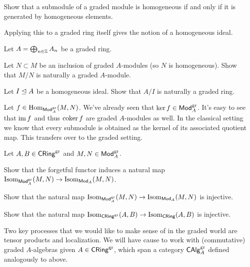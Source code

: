 \documentclass[11pt]{article}
\begin{document}
\begin{exercise}
Show that a submodule of a graded module is homogeneous if and only if it is generated by homogeneous elements.
\end{exercise}

Applying this to a graded ring itself gives the notion of a homogeneous ideal. 

\begin{exercise}
Let $A=\bigoplus_{n\in\mathbb{Z}}A_n$ be a graded ring.
\begin{enum}{\alph}
\item Let $N\subset M$ be an inclusion of graded $A$-modules (so $N$ is homogeneous). Show that $M/N$ is naturally a graded $A$-module.

\item Let $I\trianglelefteq A$ be a homogeneous ideal. Show that $A/I$ is naturally a graded ring.
\end{enum}
\end{exercise}

\begin{remark}
Let $f\in\operatorname{Hom}_{\operatorname{\mathsf{Mod}}_A^{\operatorname{gr}}}(M,N)$. We've already seen that $\ker f\in\operatorname{\mathsf{Mod}}_A^{\operatorname{gr}}$. It's easy to see that $\operatorname{im} f$ and thus $\operatorname{coker} f$ are graded $A$-modules as well. In the classical setting we know that every submodule is obtained as the kernel of its associated quotient map. This transfers over to the graded setting.
\end{remark}

\begin{exercise}
Let $A,B\in\operatorname{\mathsf{CRing}}^{\operatorname{gr}}$ and $M,N\in\operatorname{\mathsf{Mod}}_A^{\operatorname{gr}}$.
\begin{enum}{\alph}
\item Show that the forgetful functor induces a natural map $\operatorname{Isom}_{\operatorname{\mathsf{Mod}}_A^{\operatorname{gr}}}(M,N)\to\operatorname{Isom}_{\operatorname{\mathsf{Mod}}_A}(M,N)$.

\item Show that the natural map $\operatorname{Isom}_{\operatorname{\mathsf{Mod}}_A^{\operatorname{gr}}}(M,N)\to\operatorname{Isom}_{\operatorname{\mathsf{Mod}}_A}(M,N)$ is injective.

\item Show that the natural map $\operatorname{Isom}_{\operatorname{\mathsf{CRing}}^{\operatorname{gr}}}(A,B)\to\operatorname{Isom}_{\operatorname{\mathsf{CRing}}}(A,B)$ is injective.
\end{enum}
\end{exercise}

Two key processes that we would like to make sense of in the graded world are tensor products and localization. We will have cause to work with (commutative) graded $A$-algebras given $A\in\operatorname{\mathsf{CRing}}^{\operatorname{gr}}$, which span a category $\operatorname{\mathsf{CAlg}}_A^{\operatorname{gr}}$ defined analogously to above.
\end{document}
